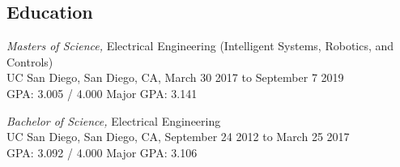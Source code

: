 \documentclass[line,margin]{res}
\begin{document}
\begin{resume}
    \section{Education}
	{\sl Masters of Science,} Electrical Engineering (Intelligent Systems, Robotics, and Controls)\\
	UC San Diego, San Diego, CA, March 30 2017 to September 7 2019\\
	GPA: 3.005 / 4.000
	Major GPA: 3.141

    
	{\sl Bachelor of Science,} Electrical Engineering \\
	UC San Diego, San Diego, CA, September 24 2012 to March 25 2017\\
	GPA: 3.092 / 4.000
	Major GPA: 3.106

\end{resume}
\end{document}
